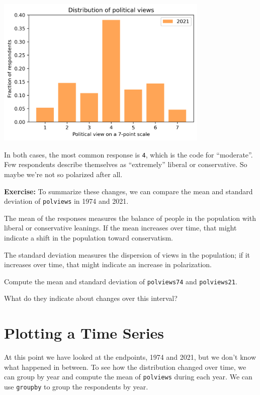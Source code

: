 \begin{center}
\includegraphics[width=4in]{chapters/02_polviews_soln_files/02_polviews_soln_34_0.png}
\end{center}

In both cases, the most common response is \passthrough{\lstinline!4!},
which is the code for ``moderate''. Few respondents describe themselves
as ``extremely'' liberal or conservative. So maybe we're not so
polarized after all.

\textbf{Exercise:} To summarize these changes, we can compare the mean
and standard deviation of \passthrough{\lstinline!polviews!} in 1974 and
2021.

The mean of the responses measures the balance of people in the
population with liberal or conservative leanings. If the mean increases
over time, that might indicate a shift in the population toward
conservatism.

The standard deviation measures the dispersion of views in the
population; if it increases over time, that might indicate an increase
in polarization.

Compute the mean and standard deviation of
\passthrough{\lstinline!polviews74!} and
\passthrough{\lstinline!polviews21!}.

What do they indicate about changes over this interval?

\hypertarget{plotting-a-time-series}{%
\section{Plotting a Time Series}\label{plotting-a-time-series}}

At this point we have looked at the endpoints, 1974 and 2021, but we
don't know what happened in between. To see how the distribution changed
over time, we can group by year and compute the mean of
\passthrough{\lstinline!polviews!} during each year. We can use
\passthrough{\lstinline!groupby!} to group the respondents by year.

